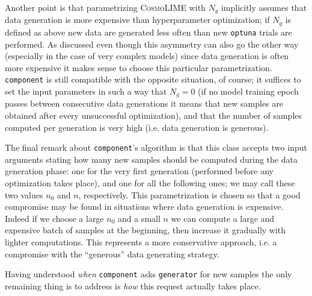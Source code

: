 Another point is that parametrizing \textsc{CosmoLIME} with $N_g$ implicitly assumes that data generation is more expensive than hyperparameter optimization; if $N_g$ is defined as above new data are generated less often than new \texttt{optuna} trials are performed. As discussed even though this asymmetry can also go the other way (especially in the case of very complex models) since data generation is often more expensive it makes sense to choose this particular parametrization.
\texttt{component} is still compatible with the opposite situation, of course; it suffices to set the input parameters in such a way that $N_g=0$ (if no model training epoch passes between consecutive data generations it means that new samples are obtained after every unsuccessful optimization), and that the number of samples computed per generation is very high (i.e. data generation is generous).

The final remark about \texttt{component}'s algorithm is that this class accepts two input arguments stating how many new samples should be computed during the data generation phase: one for the very first generation (performed before any optimization takes place), and one for all the following ones; we may call these two values $n_0$ and $n$, respectively.
This parametrization is chosen so that a good compromise may be found in situations where data generation is expensive. Indeed if we choose a large $n_0$ and a small $n$ we can compute a large and expensive batch of samples at the beginning, then increase it gradually with lighter computations. This represents a more conservative approach, i.e. a compromise with the ``generous'' data generating strategy.

Having understood \emph{when} \texttt{component} asks \texttt{generator} for new samples the only remaining thing is to address is \emph{how} this request actually takes place.

